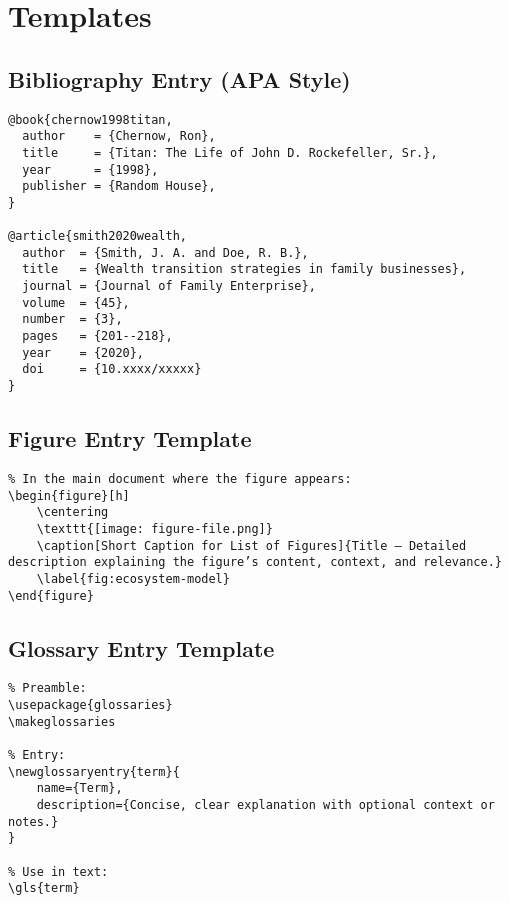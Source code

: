 \documentclass[12pt]{article}
\begin{document}
\section*{Templates}

\subsection*{Bibliography Entry (APA Style)}
\begin{verbatim}
@book{chernow1998titan,
  author    = {Chernow, Ron},
  title     = {Titan: The Life of John D. Rockefeller, Sr.},
  year      = {1998},
  publisher = {Random House},
}

@article{smith2020wealth,
  author  = {Smith, J. A. and Doe, R. B.},
  title   = {Wealth transition strategies in family businesses},
  journal = {Journal of Family Enterprise},
  volume  = {45},
  number  = {3},
  pages   = {201--218},
  year    = {2020},
  doi     = {10.xxxx/xxxxx}
}
\end{verbatim}

\subsection*{Figure Entry Template}
\begin{verbatim}
% In the main document where the figure appears:
\begin{figure}[h]
    \centering
    \texttt{[image: figure-file.png]}
    \caption[Short Caption for List of Figures]{Title – Detailed description explaining the figure’s content, context, and relevance.}
    \label{fig:ecosystem-model}
\end{figure}
\end{verbatim}

\subsection*{Glossary Entry Template}
\begin{verbatim}
% Preamble:
\usepackage{glossaries}
\makeglossaries

% Entry:
\newglossaryentry{term}{
    name={Term},
    description={Concise, clear explanation with optional context or notes.}
}

% Use in text:
\gls{term}
\end{verbatim}

\printglossaries
\end{document}
